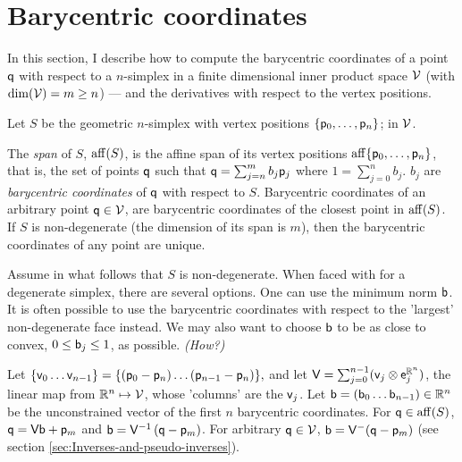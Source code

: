 
\section{Barycentric coordinates}
\label{sec:barycentric-coordinates}

In this section, I describe how to compute
the barycentric coordinates of a point $\mathsf{q}$
with respect to a $n$-simplex in
a finite dimensional inner product space $\mathcal{V}$
(with $\mathrm{dim} (\mathcal{V} ) = m \ge n$) ---
and the derivatives with respect to the vertex positions.

Let $S$ be the geometric $n$-simplex
with vertex positions $\{\mathsf{p}_0 , \ldots , \mathsf{p}_n\}$;
in $\mathcal{V}$.

The {\it span} of $S$, $\affine_span ( S )$,
is the affine span of its vertex positions
$\affine_span \{\p_0 , \ldots , \p_n\}$,
that is, the set of points $\mathsf{q}$ such that
$\mathsf{q} = \sum_{j=n}^{m} b_j \mathsf{p}_j $ where $1 = \sum_{j=0}^{n} b_j $.
$b_j$ are {\it barycentric coordinates} of $\mathsf{q}$ with respect to $S$.
Barycentric coordinates of an arbitrary point $\mathsf{q} \in \mathcal{V}$,
are barycentric coordinates of the closest point in $\affine_span(S)$.
If $S$ is non-degenerate (the dimension of its span is $m$),
then the barycentric coordinates of any point are unique.

Assume in what follows that $S$ is non-degenerate.
When faced with for a degenerate simplex, there are several options.
One can use the minimum norm $\mathsf{b}$.
It is often possible to use the barycentric coordinates
with respect to the 'largest' non-degenerate face instead.
We may also want to choose $\mathsf{b}$ to be as close to convex,
$0 \le \mathsf{b}_j \le 1$, as possible. {\it (How?)}

Let $\{ \mathsf{v}_0 \ldots \mathsf{v}_{n-1} \} = \{ (\mathsf{p}_0 - \mathsf{p}_n) \ldots (\mathsf{p}_{n-1} - \mathsf{p}_n)\},$
and let $\mathsf{V} = \sum_{j=0}^{n-1} ( \mathsf{v}_j \otimes \mathsf{e}_j^{\mathbb{R}^n} )$,
the linear map from $\mathbb{R}^n \mapsto \mathcal{V}$,
whose 'columns' are the $\mathsf{v}_j$.
Let $\mathsf{b} = \left( \mathsf{b}_0 \ldots \mathsf{b}_{n-1} \right) \in \mathbb{R}^n$
be the unconstrained vector of the first $n$ barycentric coordinates.
For $\q \in \affine_span ( S )$, $\mathsf{q} = \mathsf{V} \mathsf{b} + \mathsf{p}_m$
and $\mathsf{b} = \mathsf{V}^{-1} \left ( \mathsf{q} - \mathsf{p}_m \right)$.
For arbitrary $\mathsf{q} \in \mathcal{V}$,
$\mathsf{b} = \mathsf{V}^{-} (\mathsf{q} - \mathsf{p}_m)$
(see section \ref{sec:Inverses-and-pseudo-inverses}).













